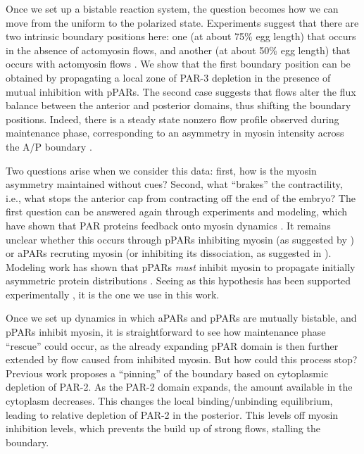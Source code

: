 \documentclass[11pt]{article}
\newcommand{\6}[1]{#1_{\text{6}}}
\newcommand{\3}[1]{#1_{\text{3}}}
\begin{document}
Once we set up a bistable reaction system, the question becomes how we can move from the uniform to the polarized state. Experiments suggest that there are two intrinsic boundary positions here: one (at about 75\% egg length) that occurs in the absence of actomyosin flows, and another (at about 50\% egg length) that occurs with actomyosin flows \cite{zonies2010symmetry}. We show that the first boundary position can be obtained by propagating a local zone of PAR-3 depletion in the presence of mutual inhibition with pPARs. The second case suggests that flows alter the flux balance between the anterior and posterior domains, thus shifting the boundary positions. Indeed, there is a steady state nonzero flow profile observed during maintenance phase, corresponding to an asymmetry in myosin intensity across the A/P boundary \cite{sailer2015dynamic}.

Two questions arise when we consider this data: first, how is the myosin asymmetry maintained without cues? Second, what ``brakes'' the contractility, i.e., what stops the anterior cap from contracting off the end of the embryo? The first question can be answered again through experiments and modeling, which have shown that PAR proteins feedback onto myosin dynamics \cite{gross2019guiding, beatty20132}. It remains unclear whether this occurs through pPARs inhibiting myosin (as suggested by \cite{beatty20132}) or aPARs recruting myosin (or inhibiting its dissociation, as suggested in \cite{gross2019guiding}). Modeling work has shown that pPARs \emph{must} inhibit myosin to propagate initially asymmetric protein distributions \cite{kravtsova2014actomyosin}. Seeing as this hypothesis has been supported experimentally \cite{munro2004cortical, beatty20132}, it is the one we use in this work.

Once we set up dynamics in which aPARs and pPARs are mutually bistable, and pPARs inhibit myosin, it is straightforward to see how maintenance phase ``rescue'' could occur, as the already expanding pPAR domain is then further extended by flow caused from inhibited myosin. But how could this process stop? Previous work \cite{goehring2011polarization} proposes a ``pinning'' of the boundary \cite{mori2008wave} based on cytoplasmic depletion of PAR-2. As the PAR-2 domain expands, the amount available in the cytoplasm decreases. This changes the local binding/unbinding equilibrium, leading to relative depletion of PAR-2 in the posterior. This levels off myosin inhibition levels, which prevents the build up of strong flows, stalling the boundary.
\end{document}
